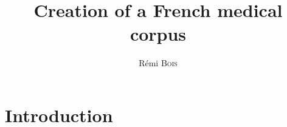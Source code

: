 \documentclass[a4paper,10pt]{article}
\title{Creation of a French medical corpus}
\author{ Rémi \textsc{Bois}}
\begin{document}
\maketitle

\tableofcontents

\newpage

\section{Introduction}
\label{sec:intro}
\end{document}
